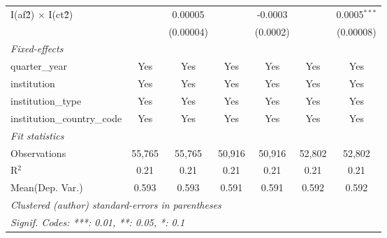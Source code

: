 \begin{tabular}{lcccccc}
   I(af\^2) $\times$ I(ct\^2)         &               & 0.00005        &               & -0.0003        &               & 0.0005$^{***}$\\   
                                      &               & (0.00004)      &               & (0.0002)       &               & (0.00008)\\   
   \midrule
   \emph{Fixed-effects}\\
   quarter\_year                      & Yes           & Yes            & Yes           & Yes            & Yes           & Yes\\  
   institution                        & Yes           & Yes            & Yes           & Yes            & Yes           & Yes\\  
   institution\_type                  & Yes           & Yes            & Yes           & Yes            & Yes           & Yes\\  
   institution\_country\_code         & Yes           & Yes            & Yes           & Yes            & Yes           & Yes\\  
   \midrule
   \emph{Fit statistics}\\
   Observations                       & 55,765        & 55,765         & 50,916        & 50,916         & 52,802        & 52,802\\  
   R$^2$                              & 0.21          & 0.21           & 0.21          & 0.21           & 0.21          & 0.21\\  
Mean(Dep. Var.) & 0.593 & 0.593 & 0.591 & 0.591 & 0.592 & 0.592 \\
   \midrule \midrule
   \multicolumn{7}{l}{\emph{Clustered (author) standard-errors in parentheses}}\\
   \multicolumn{7}{l}{\emph{Signif. Codes: ***: 0.01, **: 0.05, *: 0.1}}\\
\end{tabular}
\par\endgroup
